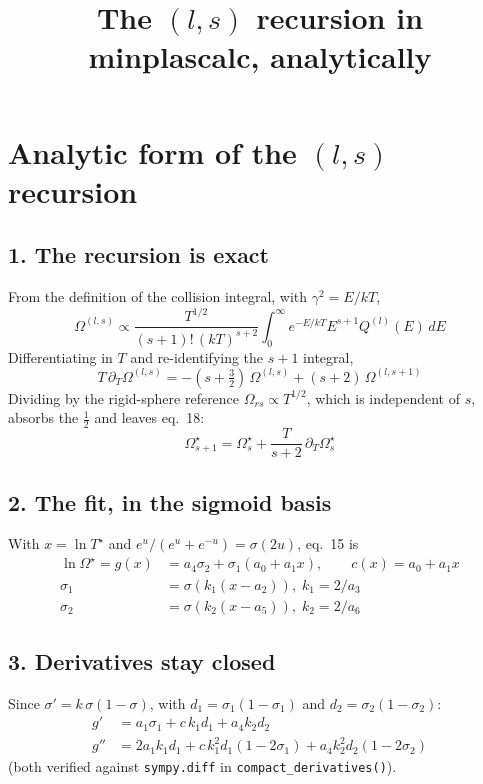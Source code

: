 \documentclass[11pt,a4paper]{article}
\title{The $(l,s)$ recursion in minplascalc, analytically}
\date{}
\begin{document}
\maketitle
\section*{Analytic form of the $(l,s)$ recursion}

\subsection*{1. The recursion is exact}
From the definition of the collision integral, with
$\gamma^2 = E/kT$,
\begin{equation}
  \Omega^{(l,s)} \propto \frac{T^{1/2}}{(s+1)!\,(kT)^{s+2}}
  \int_0^\infty e^{-E/kT} E^{s+1} Q^{(l)}(E)\,dE
\end{equation}
Differentiating in $T$ and re-identifying the $s{+}1$ integral,
\begin{equation}
  T\,\partial_T \Omega^{(l,s)}
   = -(s+\tfrac32)\,\Omega^{(l,s)} + (s+2)\,\Omega^{(l,s+1)}
\end{equation}
Dividing by the rigid-sphere reference $\Omega_{rs}\propto T^{1/2}$, which is independent of $s$, absorbs the $\tfrac12$ and leaves eq.~18:
\begin{equation}
  \boxed{\;\Omega^{\star}_{s+1} = \Omega^{\star}_{s}   + \frac{T}{s+2}\,\partial_T \Omega^{\star}_{s}\;}
\end{equation}

\subsection*{2. The fit, in the sigmoid basis}
With $x=\ln T^{\star}$ and $e^{u}/(e^{u}+e^{-u}) = \sigma(2u)$, eq.~15 is
\begin{align}
  \ln\Omega^{\star} = g(x) &= a_{4} \sigma_{2} + \sigma_{1} \left(a_{0} + a_{1} x\right), \qquad c(x) = a_0 + a_1 x \\
  \sigma_1 &= \sigma\!\left(k_1 (x-a_2)\right),\; k_1 = 2/a_3 \\
  \sigma_2 &= \sigma\!\left(k_2 (x-a_5)\right),\; k_2 = 2/a_6
\end{align}

\subsection*{3. Derivatives stay closed}
Since $\sigma' = k\,\sigma(1-\sigma)$, with $d_1 = \sigma_1(1-\sigma_1)$ and $d_2 = \sigma_2(1-\sigma_2)$:
\begin{align}
  g'  &= a_{1} \sigma_{1} + c\,k_1 d_1 + a_4 k_2 d_2 \\
  g'' &= 2 a_1 k_1 d_1 + c\,k_1^2 d_1 (1-2\sigma_1)        + a_4 k_2^2 d_2 (1-2\sigma_2)
\end{align}
(both verified against \texttt{sympy.diff} in \texttt{compact\_derivatives()}).
\end{document}
